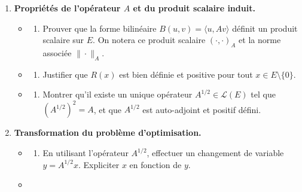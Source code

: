 \documentclass[11pt,a4paper]{report}
\begin{document}
\begin{enumerate}
\def\labelenumi{\arabic{enumi}.}

\item
  \textbf{Propriétés de l'opérateur \(A\) et du produit scalaire
  induit.}

  \begin{itemize}
  \item
    \begin{enumerate}
    \def\labelenumii{\alph{enumii})}

    \item
      Prouver que la forme bilinéaire \(B(u,v) = \langle u, Av \rangle\)
      définit un produit scalaire sur \(E\). On notera ce produit
      scalaire \((\cdot, \cdot)_A\) et la norme associée
      \(\|\cdot\|_A\).
    \end{enumerate}
  \item
    \begin{enumerate}
    \def\labelenumii{\alph{enumii})}
    \setcounter{enumii}{1}

    \item
      Justifier que \(R(x)\) est bien définie et positive pour tout
      \(x \in E \setminus \{0\}\).
    \end{enumerate}
  \item
    \begin{enumerate}
    \def\labelenumii{\alph{enumii})}
    \setcounter{enumii}{2}

    \item
      Montrer qu'il existe un unique opérateur
      \(A^{1/2} \in \mathcal{L}(E)\) tel que \((A^{1/2})^2 = A\), et que
      \(A^{1/2}\) est auto-adjoint et positif défini.
    \end{enumerate}
  \end{itemize}
\item
  \textbf{Transformation du problème d'optimisation.}

  \begin{itemize}
  \item
    \begin{enumerate}
    \def\labelenumii{\alph{enumii})}

    \item
      En utilisant l'opérateur \(A^{1/2}\), effectuer un changement de
      variable \(y = A^{1/2}x\). Expliciter \(x\) en fonction de \(y\).
    \end{enumerate}
  \item
    \begin{enumerate}
    \def\labelenumii{\alph{enumii})}
    \setcounter{enumii}{1}


\end{enumerate}
\end{itemize}
\end{enumerate}
\end{document}
